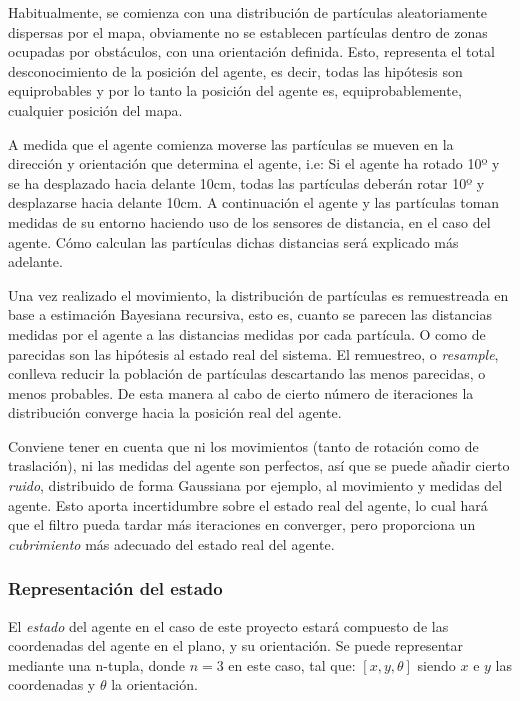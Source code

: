 Habitualmente, se comienza con una distribución de partículas aleatoriamente dispersas por el mapa, obviamente no se establecen partículas dentro de zonas ocupadas por obstáculos, con una orientación definida. Esto, representa el total desconocimiento de la posición del agente, es decir, todas las hipótesis son equiprobables y por lo tanto la posición del agente es, equiprobablemente, cualquier posición del mapa.

A medida que el agente comienza  moverse las partículas se mueven en la dirección y orientación que determina el agente, i.e: Si el agente ha rotado 10º y se ha desplazado hacia delante 10cm, todas las partículas deberán rotar 10º y desplazarse hacia delante 10cm. 
A continuación el agente y las partículas toman medidas de su entorno haciendo uso de los sensores de distancia, en el caso del agente. Cómo calculan las partículas dichas distancias será explicado más adelante.

Una vez realizado el movimiento, la distribución de partículas es remuestreada en base a estimación Bayesiana recursiva, esto es, cuanto se parecen las distancias medidas por el agente a las distancias medidas por cada partícula. O como de parecidas son las hipótesis al estado real del sistema.
El remuestreo, o \textit{resample}, conlleva reducir la población de partículas descartando las menos parecidas, o menos probables. De esta manera al cabo de cierto número de iteraciones la distribución converge hacia la posición real del agente. 

Conviene tener en cuenta que ni los movimientos (tanto de rotación como de traslación), ni las medidas del agente son perfectos, así que se puede añadir cierto \textit{ruido}, distribuido de forma Gaussiana por ejemplo, al movimiento y medidas del agente.
Esto aporta incertidumbre sobre el estado real del agente, lo cual hará que el filtro pueda tardar más iteraciones en converger, pero proporciona un \textit{cubrimiento} más adecuado del estado real del agente.

\subsubsection{Representación del estado}
El \textit{estado} del agente en el caso de este proyecto estará compuesto de las coordenadas del agente en el plano, y su orientación. Se puede representar mediante una n-tupla, donde $n=3$ en este caso, tal que: $[x, y, \theta]$ siendo $x$ e $y$ las coordenadas y $\theta$ la orientación. 

